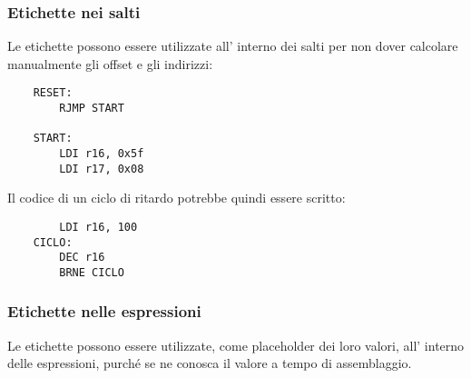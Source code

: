 \subsubsection{Etichette nei salti}
Le etichette possono essere utilizzate all' interno dei salti per non dover calcolare manualmente gli offset e gli indirizzi:
\begin{verbatim}
    RESET:
        RJMP START
    
    START:
        LDI r16, 0x5f
        LDI r17, 0x08
\end{verbatim}
Il codice di un ciclo di ritardo potrebbe quindi essere scritto:
\begin{verbatim}
        LDI r16, 100
    CICLO:
        DEC r16
        BRNE CICLO
\end{verbatim}

\subsubsection{Etichette nelle espressioni}
Le etichette possono essere utilizzate, come placeholder dei loro valori, all' interno delle espressioni, purché se ne conosca il valore a tempo di assemblaggio.







